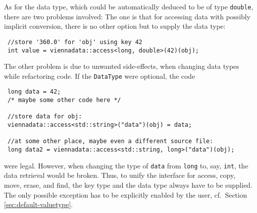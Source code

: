 As for the data type, which could be automatically deduced to be of type \lstinline|double|, there are two problems involved:
The one is that for accessing data with possibly implicit conversion, there is no other option but to supply the data type:
\begin{lstlisting}
 //store '360.0' for 'obj' using key 42
 int value = viennadata::access<long, double>(42)(obj);
\end{lstlisting}
The other problem is due to unwanted side-effects, when changing data types while refactoring code. If the \lstinline|DataType| were optional, the code
\begin{lstlisting}
 long data = 42;
 /* maybe some other code here */

 //store data for obj:
 viennadata::access<std::string>("data")(obj) = data;

 //at some other place, maybe even a different source file:
 long data2 = viennadata::access<std::string, long>("data")(obj);
\end{lstlisting}
were legal. However, when changing the type of \lstinline|data| from \lstinline|long| to, say, \lstinline|int|, the data retrieval would be broken.
Thus, to unify the interface for access, copy, move, erase, and find, the key type and the data type always have to be supplied.
The only possible exception has to be explicitly enabled by the user, cf.~Section \ref{sec:default-valuetype}.



%
%

